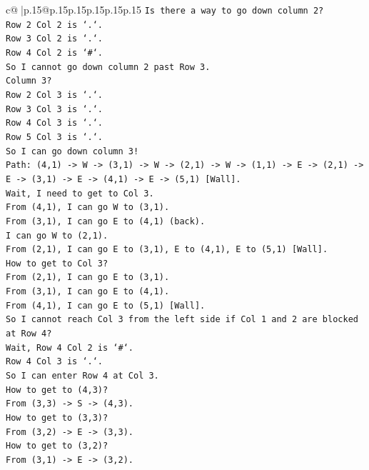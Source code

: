 \documentclass{article}
\begin{document}
{\begin{supertabular}{c@{$\;$}|p{.15\linewidth}@{}p{.15\linewidth}p{.15\linewidth}p{.15\linewidth}p{.15\linewidth}p{.15\linewidth}}
{{{\texttt{Is there a way to go down column 2?} \\
\texttt{Row 2 Col 2 is `.`.} \\
\texttt{Row 3 Col 2 is `.`.} \\
\texttt{Row 4 Col 2 is `\#`.} \\
\texttt{So I cannot go down column 2 past Row 3.} \\
\texttt{Column 3?} \\
\texttt{Row 2 Col 3 is `.`.} \\
\texttt{Row 3 Col 3 is `.`.} \\
\texttt{Row 4 Col 3 is `.`.} \\
\texttt{Row 5 Col 3 is `.`.} \\
\texttt{So I can go down column 3!} \\
\texttt{Path: (4,1) {-}> W {-}> (3,1) {-}> W {-}> (2,1) {-}> W {-}> (1,1) {-}> E {-}> (2,1) {-}> E {-}> (3,1) {-}> E {-}> (4,1) {-}> E {-}> (5,1) {[}Wall{]}.} \\
\texttt{Wait, I need to get to Col 3.} \\
\texttt{From (4,1), I can go W to (3,1).} \\
\texttt{From (3,1), I can go E to (4,1) (back).} \\
\texttt{I can go W to (2,1).} \\
\texttt{From (2,1), I can go E to (3,1), E to (4,1), E to (5,1) {[}Wall{]}.} \\
\texttt{How to get to Col 3?} \\
\texttt{From (2,1), I can go E to (3,1).} \\
\texttt{From (3,1), I can go E to (4,1).} \\
\texttt{From (4,1), I can go E to (5,1) {[}Wall{]}.} \\
\texttt{So I cannot reach Col 3 from the left side if Col 1 and 2 are blocked at Row 4?} \\
\texttt{Wait, Row 4 Col 2 is `\#`.} \\
\texttt{Row 4 Col 3 is `.`.} \\
\texttt{So I can enter Row 4 at Col 3.} \\
\texttt{How to get to (4,3)?} \\
\texttt{From (3,3) {-}> S {-}> (4,3).} \\
\texttt{How to get to (3,3)?} \\
\texttt{From (3,2) {-}> E {-}> (3,3).} \\
\texttt{How to get to (3,2)?} \\
\texttt{From (3,1) {-}> E {-}> (3,2).} \\
}}}
\end{supertabular}}
\end{document}
